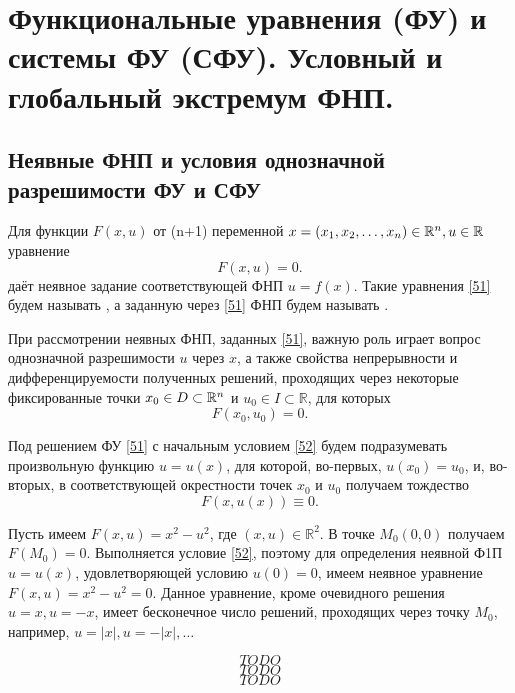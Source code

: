 \section{Функциональные уравнения (ФУ) и системы ФУ (СФУ). Условный и глобальный экстремум ФНП.}
\subsection{Неявные ФНП и условия однозначной разрешимости ФУ и СФУ}

Для функции $F(x,u)$ от (n+1) переменной $x = (x_1, x_2, \ldots, x_n) \in \mathbb{R}^n, u \in \mathbb{R}$ уравнение 
\begin{equation}
\label{51}
F(x,u) = 0.
\end{equation} 
даёт неявное задание соответствующей ФНП $u = f(x)$. Такие уравнения \eqref{51} будем называть , а заданную через \eqref{51} ФНП будем называть .

При рассмотрении неявных ФНП, заданных \eqref{51}, важную роль играет вопрос однозначной разрешимости $u$ через $ x $, а также свойства непрерывности и дифференцируемости полученных решений, проходящих через некоторые фиксированные точки $x_0 \in D \subset \mathbb{R}^n$ и $u_0 \in I \subset \mathbb{R}$, для которых 
\begin{equation}
\label{52}
F(x_0, u_0) = 0.
\end{equation}

Под решением ФУ \eqref{51} с начальным условием \eqref{52} будем подразумевать произвольную функцию $u = u(x)$, для которой, во-первых, $u (x_0) = u_0$, и, во-вторых, в соответствующей окрестности точек $x_0$ и $u_0$ получаем тождество
\begin{equation}
\label{53}
F(x, u(x)) \equiv 0.
\end{equation}
\begin{example}
	Пусть имеем $F(x,u) = x^2 - u^2$, где $(x,u) \in \mathbb{R}^2$. В точке $M_0(0,0) $ получаем ${ F(M_0) = 0}$. Выполняется условие \eqref{52}, поэтому для определения неявной Ф1П $u = u(x)$, удовлетворяющей условию $u(0) = 0$, имеем неявное уравнение $F(x,u) = x^2 - u^2 = 0$. Данное уравнение, кроме очевидного решения $u = x, u = -x$, имеет бесконечное число решений, проходящих через точку $M_0$, например, $u = |x|, u = -|x|, \ldots$ 
\end{example}


\begin{equation}
TODO
\end{equation}
\begin{equation}
TODO
\end{equation}
\begin{equation}
    TODO
\end{equation}
\newpage


